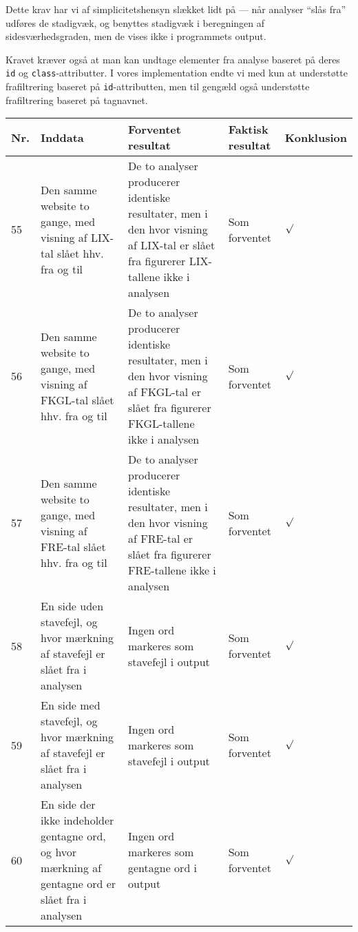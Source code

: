 \documentclass[a4paper,oneside,article]{memoir}
\begin{document}
\begin{landscape}
Dette krav har vi af simplicitetshensyn slækket lidt på --- når
analyser ``slås fra'' udføres de stadigvæk, og benyttes stadigvæk i
beregningen af sidesværhedsgraden, men de vises ikke i programmets
output.

Kravet kræver også at man kan undtage elementer fra analyse baseret på
deres \texttt{id} og \texttt{class}-attributter. I vores
implementation endte vi med kun at understøtte frafiltrering baseret
på \texttt{id}-attributten, men til gengæld også understøtte
frafiltrering baseret på tagnavnet.

\begin{longtable}[c]{p{20pt}|p{220pt}|p{130pt}|p{130pt}|p{50pt}}
\textbf{Nr.} &
\textbf{Inddata} &
\textbf{Forventet resultat} &
\textbf{Faktisk resultat} &
\textbf{Konklusion} \\ \hline

55 &
Den samme website to gange, med visning af LIX-tal slået hhv. fra og til &
De to analyser producerer identiske resultater, men i den hvor visning
af LIX-tal er slået fra figurerer LIX-tallene ikke i analysen &
Som forventet &
$\surd$ \\ \hline

56 &
Den samme website to gange, med visning af FKGL-tal slået hhv. fra og til &
De to analyser producerer identiske resultater, men i den hvor visning
af FKGL-tal er slået fra figurerer FKGL-tallene ikke i analysen &
Som forventet &
$\surd$ \\ \hline

57 &
Den samme website to gange, med visning af FRE-tal slået hhv. fra og til &
De to analyser producerer identiske resultater, men i den hvor visning
af FRE-tal er slået fra figurerer FRE-tallene ikke i analysen &
Som forventet &
$\surd$ \\ \hline

58 &
En side uden stavefejl, og hvor mærkning af stavefejl er slået fra
i analysen &
Ingen ord markeres som stavefejl i output &
Som forventet &
$\surd$ \\ \hline

59 &
En side med stavefejl, og hvor mærkning af stavefejl er slået fra
i analysen &
Ingen ord markeres som stavefejl i output &
Som forventet &
$\surd$ \\ \hline

60 &
En side der ikke indeholder gentagne ord, og hvor mærkning af gentagne ord er slået fra
i analysen &
Ingen ord markeres som gentagne ord i output &
Som forventet &
$\surd$ \\ \hline


\end{longtable}
\end{landscape}
\end{document}
